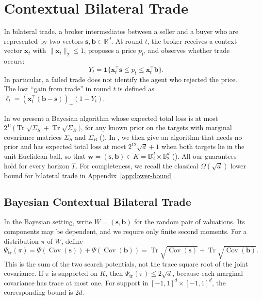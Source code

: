 \documentclass[11pt]{article}
\newcommand{\R}{\mathbb R}
\DeclareMathOperator{\Cov}{Cov}
\DeclareMathOperator{\Tr}{Tr}
\newcommand{\norm}[1]{\lVert #1\rVert_2}
\newcommand{\bs}{\boldsymbol s}
\newcommand{\bb}{\boldsymbol b}
\newcommand{\bx}{\boldsymbol x}
\begin{document}
\section{Contextual Bilateral Trade}\label{sec:trade}\label{sec:trade-model}

In bilateral trade, a broker intermediates between a seller and a buyer who are represented by two vectors $\boldsymbol s,\boldsymbol b\in\R^d$. {At round $t$, the broker receives a context vector $\bx_t$ with $\norm{\bx_t}\le1$, proposes a price $p_t$, and observes whether trade occurs:}
\[
 Y_t=\mathbf1\{\bx_t^\top\boldsymbol s\le p_t\le\bx_t^\top\boldsymbol b\}.
\]
In particular, a failed trade does not identify the agent who rejected the price. The lost ``gain from trade'' in round $t$ is defined as 
\(
 \ell_t=(\bx_t^\top(\boldsymbol b-\boldsymbol s))_+(1-Y_t).
\)

In  we present a Bayesian algorithm whose expected total loss is at most {$2^{11}\bigl(\Tr\sqrt{\Sigma_S}+\Tr\sqrt{\Sigma_B}\bigr)$}, for any known prior on the targets with marginal covariance matrices $\Sigma_S$ and $\Sigma_B$ (). In , we
then give an algorithm that needs no prior and has expected total loss at most ${2^{12}\sqrt d+1}$ when both targets lie in the unit Euclidean {ball, so that} $\boldsymbol w=(\boldsymbol s,\boldsymbol b)\in K=\mathbb B_2^d\times\mathbb B_2^d$ (). All our guarantees hold for every horizon $T$. For completeness, we recall the classical $\Omega(\sqrt d)$ lower bound for bilateral trade in Appendix~\ref{app:lower-bound}.

\subsection{Bayesian Contextual Bilateral Trade}\label{sec:trade-bayes}

In the Bayesian setting, write $W=(\bs,\bb)$ for the random pair of valuations. Its components may be dependent, and we require only finite second moments. For a distribution $\pi$ of $W$, define 
\begin{equation}\label{eq:trade-bayesian-potential}
 \Psi_{\mathrm{tr}}(\pi)
 =\Psi(\Cov(\bs))+\Psi(\Cov(\bb))
 =\Tr\sqrt{\Cov(\bs)}+\Tr\sqrt{\Cov(\bb)}.
\end{equation}
This is the sum of the two search potentials, not the trace square root of the joint covariance. If $\pi$ is supported on $K$, then $\Psi_{\mathrm{tr}}(\pi)\le2\sqrt d$, because each marginal covariance has trace at most one. For support in $[-1,1]^d\times[-1,1]^d$, the corresponding bound is $2d$.
\end{document}
